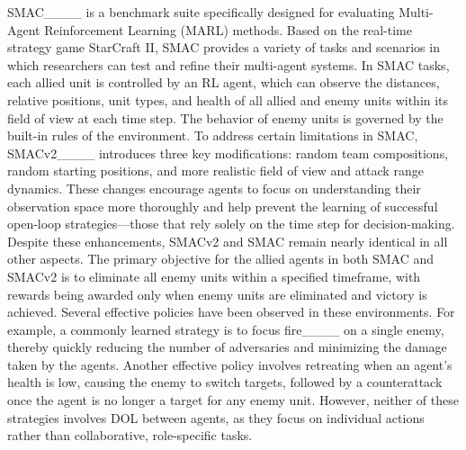 SMAC____ is a benchmark suite specifically designed for evaluating Multi-Agent Reinforcement Learning (MARL) methods.
Based on the real-time strategy game StarCraft II, SMAC provides a variety of tasks and scenarios in which researchers can test and refine their multi-agent systems.
In SMAC tasks, each allied unit is controlled by an RL agent, which can observe the distances, relative positions, unit types, and health of all allied and enemy units within its field of view at each time step.
The behavior of enemy units is governed by the built-in rules of the environment.
To address certain limitations in SMAC, SMACv2____ introduces three key modifications: random team compositions, random starting positions, and more realistic field of view and attack range dynamics.
These changes encourage agents to focus on understanding their observation space more thoroughly and help prevent the learning of successful open-loop strategies—those that rely solely on the time step for decision-making.
Despite these enhancements, SMACv2 and SMAC remain nearly identical in all other aspects.
The primary objective for the allied agents in both SMAC and SMACv2 is to eliminate all enemy units within a specified timeframe, with rewards being awarded only when enemy units are eliminated and victory is achieved.
Several effective policies have been observed in these environments.
For example, a commonly learned strategy is to focus fire____ on a single enemy, thereby quickly reducing the number of adversaries and minimizing the damage taken by the agents.
Another effective policy involves retreating when an agent's health is low, causing the enemy to switch targets, followed by a counterattack once the agent is no longer a target for any enemy unit.
However, neither of these strategies involves DOL between agents, as they focus on individual actions rather than collaborative, role-specific tasks.


